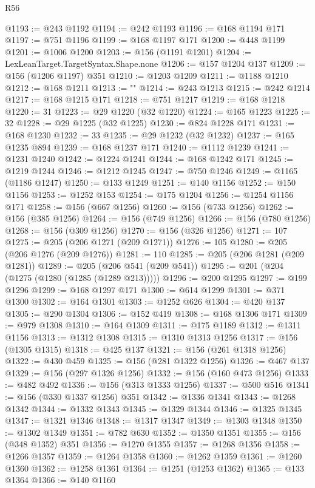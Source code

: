 \begin{lexlean}{R56}
\begin{coremodule}
{{{{{{{{{{{{{{{{{{{{{{{{{{{{{{{{{{{{{{{{{{{{{{{{{{{{{{{{{{{{{{{{{{{{{{{{{{{{{{{{{{{{{{{{{{{{{{{{{{{{{{{{{{{{{{{{{{{{{{{{{{{{{{{{{{{{{{{{{{{{{{{{{{{{{{{{{{{{{{{{{{{{{{{{{{{{{{{{{{{{{{{{{{{{{{{{{{{{{{{{{{{{{{{{{{{{@1193 := @243 @1192
@1194 := @242 @1193
@1196 := @168 @1194 @171
@1197 := @751 @1196
@1199 := @168 @1197 @171
@1200 := @448 @1199
@1201 := @1006 @1200
@1203 := @156 (@1191 @1201)
@1204 := LexLeanTarget.TargetSyntax.Shape.none
@1206 := @157 @1204 @137
@1209 := @156 (@1206 @1197) @351
@1210 := @1203 @1209
@1211 := @1188 @1210
@1212 := @168 @1211
@1213 := "}"
@1214 := @243 @1213
@1215 := @242 @1214
@1217 := @168 @1215 @171
@1218 := @751 @1217
@1219 := @168 @1218
@1220 := 31
@1223 := @29 @1220 (@32 @1220)
@1224 := @165 @1223
@1225 := 32
@1228 := @29 @1225 (@32 @1225)
@1230 := @824 @1228 @171
@1231 := @168 @1230
@1232 := 33
@1235 := @29 @1232 (@32 @1232)
@1237 := @165 @1235 @894
@1239 := @168 @1237 @171
@1240 := @1112 @1239
@1241 := @1231 @1240
@1242 := @1224 @1241
@1244 := @168 @1242 @171
@1245 := @1219 @1244
@1246 := @1212 @1245
@1247 := @750 @1246
@1249 := @1165 (@1186 @1247)
@1250 := @133 @1249
@1251 := @140 @1156
@1252 := @150 @1156
@1253 := @1252 @153
@1254 := @175 @1204
@1256 := @1254 @1156 @171
@1258 := @156 (@667 @1256)
@1260 := @156 (@733 @1256)
@1262 := @156 (@385 @1256)
@1264 := @156 (@749 @1256)
@1266 := @156 (@780 @1256)
@1268 := @156 (@309 @1256)
@1270 := @156 (@326 @1256)
@1271 := 107
@1275 := @205 (@206 @1271 (@209 @1271))
@1276 := 105
@1280 := @205 (@206 @1276 (@209 @1276))
@1281 := 110
@1285 := @205 (@206 @1281 (@209 @1281))
@1289 := @205 (@206 @541 (@209 @541))
@1295 := @201 (@204 (@1275 (@1280 (@1285 (@1289 @213)))))
@1296 := @200 @1295
@1297 := @199 @1296
@1299 := @168 @1297 @171
@1300 := @614 @1299
@1301 := @371 @1300
@1302 := @164 @1301
@1303 := @1252 @626
@1304 := @420 @137
@1305 := @290 @1304
@1306 := @152 @419
@1308 := @168 @1306 @171
@1309 := @979 @1308
@1310 := @164 @1309
@1311 := @175 @1189
@1312 := @1311 @1156
@1313 := @1312 @1308
@1315 := @1310 @1313 @1256
@1317 := @156 (@1305 @1315)
@1318 := @425 @137
@1321 := @156 (@261 @1318 @1256)
@1322 := @430 @459
@1325 := @156 (@281 @1322 @1256)
@1326 := @467 @137
@1329 := @156 (@297 @1326 @1256)
@1332 := @156 (@160 @473 @1256)
@1333 := @482 @492
@1336 := @156 (@313 @1333 @1256)
@1337 := @500 @516
@1341 := @156 (@330 @1337 @1256) @351
@1342 := @1336 @1341
@1343 := @1268 @1342
@1344 := @1332 @1343
@1345 := @1329 @1344
@1346 := @1325 @1345
@1347 := @1321 @1346
@1348 := @1317 @1347
@1349 := @1303 @1348
@1350 := @1302 @1349
@1351 := @782 @630
@1352 := @1350 @1351
@1355 := @156 (@348 @1352) @351
@1356 := @1270 @1355
@1357 := @1268 @1356
@1358 := @1266 @1357
@1359 := @1264 @1358
@1360 := @1262 @1359
@1361 := @1260 @1360
@1362 := @1258 @1361
@1364 := @1251 (@1253 @1362)
@1365 := @133 @1364
@1366 := @140 @1160
}}}}}}}}}}}}}}}}}}}}}}}}}}}}}}}}}}}}}}}}}}}}}}}}}}}}}}}}}}}}}}}}}}}}}}}}}}}}}}}}}}}}}}}}}}}}}}}}}}}}}}}}}}}}}}}}}}}}}}}}}}}}}}}}}}}}}}}}}}}}}}}}}}}}}}}}}}}}}}}}}}}}}}}}}}}}}}}}}}}}}}}}}}}}}}}}}}}}}}}}}}}}}}}}}}}
\end{coremodule}
\end{lexlean}
